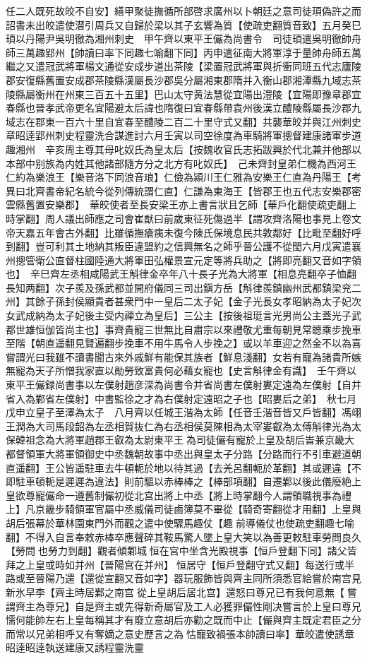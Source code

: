 任二人既死故皎不自安】繕甲聚徒撫循所部啓求廣州以卜朝廷之意司徒頊偽許之而詔書未出皎遣使潜引周兵又自歸於梁以其子玄響為質【使疏吏翻質音致】五月癸巳頊以丹陽尹吳明徹為湘州刺史　甲午齊以東平王儼為尚書令　司徒頊遣吳明徹帥舟師三萬趣郢州【帥讀曰率下同趣七喻翻下同】丙申遣征南大將軍淳于量帥舟師五萬繼之又遣冠武將軍楊文通從安成步道出茶陵【梁置冠武將軍與折衝同班五代志廬陵郡安復縣舊置安成郡茶陵縣漢屬長沙郡吳分屬湘東郡隋并入衡山郡湘潭縣九域志茶陵縣屬衡州在州東三百五十五里】巴山太守黄法慧從宜陽出澧陵【宜陽即豫章郡宜春縣也晉孝武帝更名宜陽避太后諱也隋復曰宜春縣帶袁州後漢立醴陵縣屬長沙郡九域志在郡東一百六十里自宜春至醴陵二百二十里守式又翻】共襲華皎并與江州刺史章昭逹郢州刺史程靈洗合謀進討六月壬寅以司空徐度為車騎將軍摠督建康諸軍步道趣湘州　辛亥周主尊其母叱奴氏為皇太后【按魏收官氏志拓跋興於代北兼并他部以本部中别族為内姓其他諸部隨方分之北方有叱奴氏】　己未齊封皇弟仁機為西河王仁約為樂浪王【樂音洛下同浪音琅】仁儉為潁川王仁雅為安樂王仁直為丹陽王【考異曰北齊書帝紀名統今從列傳統謂仁直】仁謙為東海王【皆郡王也五代志安樂郡密雲縣舊置安樂郡】　華皎使者至長安梁王亦上書言狀且乞師【華戶化翻使疏吏翻上時掌翻】周人議出師應之司會崔猷曰前歲東征死傷過半【謂攻齊洛陽也事見上卷文帝天嘉五年會古外翻】比雖循撫瘡痍未復今陳氏保境息民共敦鄰好【比毗至翻好呼到翻】豈可利其土地納其叛臣違盟約之信興無名之師乎晉公護不從閠六月戊寅遣襄州摠管衛公直督柱國陸通大將軍田弘權景宣元定等將兵助之【將即亮翻又音如字領也】　辛巳齊左丞相咸陽武王斛律金卒年八十長子光為大將軍【相息亮翻卒子恤翻長知两翻】次子羨及孫武都並開府儀同三司出鎭方岳【斛律羨鎮幽州武都鎮梁兖二州】其餘子孫封侯顯貴者甚衆門中一皇后二太子妃【金子光長女孝昭納為太子妃次女武成納為太子妃後主受内禪立為皇后】三公主【按後祖珽言光男尚公主蓋光子武都世雄恒伽皆尚主也】事齊貴寵三世無比自肅宗以來禮敬尤重每朝見常聼乘步挽車至階【朝直遥翻見賢遍翻步挽車不用牛馬令人步挽之】或以羊車迎之然金不以為喜嘗謂光曰我雖不讀書聞古來外戚鮮有能保其族者【鮮息淺翻】女若有寵為諸貴所嫉無寵為天子所憎我家直以勛勞致富貴何必藉女寵也【史言斛律金有識】　壬午齊以東平王儼録尚書事以左僕射趙彦深為尚書令并省尚書左僕射婁定遠為左僕射【自并省入為鄴省左僕射】中書監徐之才為右僕射定遠昭之子也【昭婁后之弟】　秋七月戊申立皇子至澤為太子　八月齊以任城王湝為太師【任音壬湝音皆又戶皆翻】馮翊王潤為大司馬段韶為左丞相賀抜仁為右丞相侯莫陳相為太宰婁叡為太傅斛律光為太保韓祖念為大將軍趙郡王叡為太尉東平王為司徒儼有寵於上皇及胡后峕兼京畿大都督領軍大將軍領御史中丞魏朝故事中丞出與皇太子分路【分路而行不引車避道朝直遥翻】王公皆遥駐車去牛頓軛於地以待其過【去羌呂翻軛於革翻】其或遲違【不即駐車頓軛是遲遲為違法】則前驅以赤棒棒之【棒部項翻】自遷鄴以後此儀廢絶上皇欲尊寵儼命一遵舊制儼初從北宫出將上中丞【將上時掌翻今人謂領職視事為禮上】凡京畿步騎領軍官屬中丞威儀司徒鹵簿莫不畢從【騎奇寄翻從才用翻】上皇與胡后張幕於華林園東門外而觀之遣中使驟馬趣仗【趣前導儀仗也使疏吏翻趣七喻翻】不得入自言奉敕赤棒卒應聲碎其鞍馬驚人墜上皇大笑以為善更敕駐車勞問良久【勞問也勞力到翻】觀者傾鄴城恒在宫中坐含光殿視事【恒戶登翻下同】諸父皆拜之上皇或時如并州【晉陽宫在并州】恒居守【恒戶登翻守式又翻】每送行或半路或至晉陽乃還【還從宣翻又音如字】器玩服飾皆與齊主同所須悉官給嘗於南宫見新氷早李【齊主時居鄴之南宫從上皇胡后居北宫】還怒曰尊兄已有我何意無【嘗謂齊主為尊兄】自是齊主或先得新奇屬官及工人必獲罪儼性剛决嘗言於上皇曰尊兄懦何能帥左右上皇每稱其才有廢立意胡后亦勸之既而中止【儼與齊主既定君臣之分而常以兄弟相呼又有奪嫡之意史歷言之為怙寵致禍張本帥讀曰率】華皎遣使誘章昭逹昭逹執送建康又誘程靈洗靈

